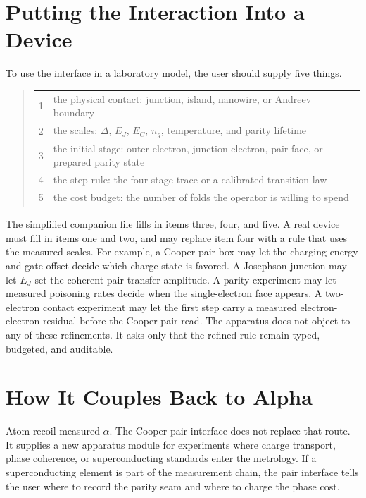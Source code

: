 \section{Putting the Interaction Into a Device}

To use the interface in a laboratory model, the user should supply five things.

\begin{quote}\small
\begin{tabular}{c|p{}}
1 & the physical contact: junction, island, nanowire, or Andreev boundary\\
2 & the scales: \(\Delta\), \(E_J\), \(E_C\), \(n_g\), temperature, and parity lifetime\\
3 & the initial stage: outer electron, junction electron, pair face, or prepared parity state\\
4 & the step rule: the four-stage trace or a calibrated transition law\\
5 & the cost budget: the number of folds the operator is willing to spend
\end{tabular}
\end{quote}

The simplified companion file fills in items three, four, and five. A real device must fill in items one and two,
and may replace item four with a rule that uses the measured scales. For example, a Cooper-pair box may let the
charging energy and gate offset decide which charge state is favored. A Josephson junction may let \(E_J\) set
the coherent pair-transfer amplitude. A parity experiment may let measured poisoning rates decide when the
single-electron face appears. A two-electron contact experiment may let the first step carry a measured
electron-electron residual before the Cooper-pair read. The apparatus does not object to any of these
refinements. It asks only that the refined rule remain typed, budgeted, and auditable.

\section{How It Couples Back to Alpha}

Atom recoil measured \(\alpha\). The Cooper-pair interface does not replace that route. It supplies a new
apparatus module for experiments where charge transport, phase coherence, or superconducting standards enter the
metrology. If a superconducting element is part of the measurement chain, the pair interface tells the user where
to record the parity seam and where to charge the phase cost.

